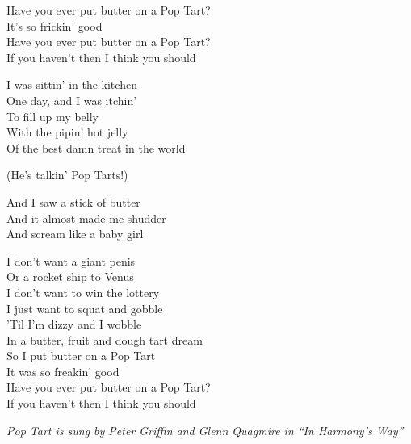 \vspace{10pt}
Have you ever put butter on a Pop Tart?\\
It's so frickin' good\\
Have you ever put butter on a Pop Tart?\\
If you haven't then I think you should\par
\vspace{10pt}
I was sittin' in the kitchen\\
One day, and I was itchin'\\
To fill up my belly\\
With the pipin' hot jelly\\
Of the best damn treat in the world\par
\vspace{10pt}
(He's talkin' Pop Tarts!)\par
\vspace{10pt}
And I saw a stick of butter\\
And it almost made me shudder\\
And scream like a baby girl\par
\vspace{10pt}
I don't want a giant penis\\
Or a rocket ship to Venus\\
I don't want to win the lottery\\
I just want to squat and gobble\\
'Til I'm dizzy and I wobble\\
In a butter, fruit and dough tart dream\\
So I put butter on a Pop Tart\\
It was so freakin' good\\
Have you ever put butter on a Pop Tart?\\
If you haven't then I think you should\par
\vspace{10pt}
{\footnotesize\textit{Pop Tart is sung by Peter Griffin and Glenn Quagmire in ``In Harmony's Way''}}
